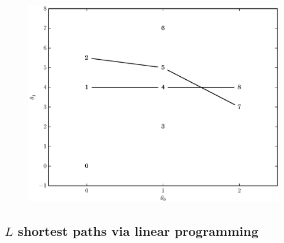 \begin{figure}[!t]
    \caption{\label{plot:simple_graph_greedy_paths}}
    \centering
    \includegraphics[width=\figwidthscale\textwidth]{plots/small_graph_ex_greedy_paths.eps}
    \CaptionWithTitle{%
    }{}
\end{figure}

\subsection{$L$ shortest paths via linear programming}

